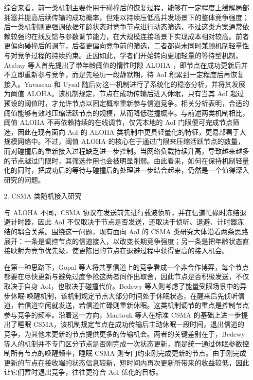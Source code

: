 综合来看，前一类机制主要作用于碰撞后的恢复过程，能够在一定程度上缓解局部拥塞并提高后续传输的成功概率，但难以持续压低高并发场景下的整体竞争强度；后一类机制则更强调依据年龄状态对竞争节点进行动态筛选，不过这类方案通常依赖较强的在线反馈与参数调节能力，在大规模连接场景下实现成本相对较高。前者更偏向碰撞后的调节，后者更偏向竞争前的筛选，二者都尚未同时兼顾机制轻量性与对竞争过程的持续约束。正因如此，学者们开始转向更加轻量的等待型机制。Atabay 等人首先提出了带年龄阈值的惰性时隙 ALOHA ，即节点在成功更新后并不立即重新参与竞争，而是先经历一段静默期，待 AoI 积累到一定程度后再恢复接入。Yavascan 和 Uysal 随后对这一机制进行了系统化的稳态分析，并将其发展为阈值 ALOHA。该机制规定，节点在成功传输后进入休眠，只有当其 AoI 超过预设的阈值时，才允许节点以固定概率重新参与信道竞争。相关分析表明，合适的阈值能够有效地压缩活跃节点的规模，从而降低碰撞概率。与前述两类机制相比，阈值 ALOHA 不再依赖持续的在线调节，仅凭本地的 AoI 门限便可完成节点筛选，因此在现有面向 AoI 的 ALOHA 类机制中更具轻量化的特征，更易部署于大规模网络中。不过，阈值 ALOHA 的核心在于通过门限来压缩活跃节点的数量，而对碰撞后的重新接入过程缺乏进一步控制。当网络负载持续升高，导致越来越多的节点越过门限时，其筛选作用也会被明显削弱。由此看来，如何在保持机制轻量化的同时，把成功后的等待与碰撞后的处理进一步结合起来，仍然是一个值得深入研究的问题。


2. CSMA 类随机接入研究

与 ALOHA 不同，CSMA 协议在发送前先进行载波侦听，并在信道忙碌时冻结退避计时器，因此 AoI 不仅取决于节点是否发送，还取决于侦听、退避、计时器冻结的耦合关系。围绕这一问题，现有面向 AoI 的 CSMA 类研究大体沿着两条思路展开：一条是调控节点的信道接入，以改变长期竞争强度；另一条是把年龄状态直接映射为竞争优先级，使更陈旧的节点在退避过程中获得更高的接入机会。

在第一种思路下，Gopal 等人将共享信道上的竞争看成一个非合作博弈，每个节点都要在尽快更新与避免过度争抢这两者间作出取舍，因此节点是否积极发送，不仅取决于自身 AoI，也取决于碰撞代价。Bedewy 等人则考虑了能量受限场景中的异步休眠-唤醒机制，该机制规定节点大部分时间处于休眠状态，在醒来后先侦听信道，若信道空闲就发送，若信道忙碌则重新休眠。这类机制调节的重点是控制节点参与竞争的频率。沿着这一方向，Maatouk 等人在标准 CSMA 的基础上进一步提出了睡眠 CSMA，该机制规定节点在成功传输后主动休眠一段时间，退出信道的竞争，为其他未更新的节点提供更多的传输机会。两者的关键差别在于，Bedewy 等人的机制并不专门区分节点是否刚完成一次状态更新，而是统一通过休眠参数控制所有节点的唤醒频率，睡眠 CSMA 则专门约束刚完成更新的节点。由于刚完成更新的节点在接收端的状态信息较新，短时间内再次更新所带来的收益较低，因此让它们暂时退出竞争，往往更符合 AoI 优化的目标。

